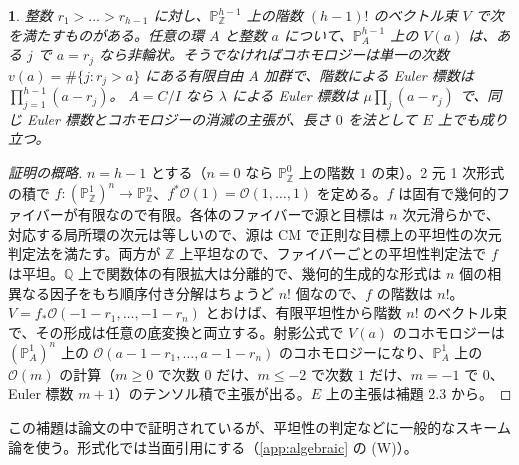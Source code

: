 \documentclass[11pt,a4paper]{ltjsarticle}
\newcommand{\stmtname}{}
\theoremstyle{plain}
\newtheorem*{stmtgen}{\stmtname}
\newenvironment{stmt}[1]{\renewcommand{\stmtname}{#1}\begin{stmtgen}}{\end{stmtgen}}
\theoremstyle{definition}
\newcommand{\Z}{\mathbb{Z}}
\newcommand{\Q}{\mathbb{Q}}
\newcommand{\PP}{\mathbb{P}}
\newcommand{\cO}{\mathcal{O}}
\begin{document}
\begin{stmt}{補題 2.6（Eisenbud--Schreyer の構成）}
整数 $r_1>\dots>r_{h-1}$ に対し、$\PP^{h-1}_\Z$ 上の階数 $(h-1)!$ のベクトル束 $V$ で次を満たすものがある。任意の環 $A$ と整数 $a$ について、$\PP^{h-1}_A$ 上の $V(a)$ は、ある $j$ で $a = r_j$ なら非輪状。そうでなければコホモロジーは単一の次数
$v(a) = \#\{j: r_j>a\}$
にある有限自由 $A$ 加群で、階数による Euler 標数は $\prod_{j=1}^{h-1}(a-r_j)$。
$A = C/I$ なら $\lambda$ による Euler 標数は $\mu\prod_j(a-r_j)$ で、同じ Euler 標数とコホモロジーの消滅の主張が、長さ $0$ を法として $E$ 上でも成り立つ。
\end{stmt}
\begin{proof}[証明の概略]
$n = h-1$ とする（$n = 0$ なら $\PP^0_\Z$ 上の階数 $1$ の束）。2 元 1 次形式の積で
$f\colon(\PP^1_\Z)^n\to\PP^n_\Z$、$f^*\cO(1) = \cO(1,\dots,1)$
を定める。$f$ は固有で幾何的ファイバーが有限なので有限。各体のファイバーで源と目標は $n$ 次元滑らかで、対応する局所環の次元は等しいので、源は CM で正則な目標上の平坦性の次元判定法を満たす。両方が $\Z$ 上平坦なので、ファイバーごとの平坦性判定法で $f$ は平坦。$\Q$ 上で関数体の有限拡大は分離的で、幾何的生成的な形式は $n$ 個の相異なる因子をもち順序付き分解はちょうど $n!$ 個なので、$f$ の階数は $n!$。
$V = f_*\cO(-1-r_1,\dots,-1-r_n)$
とおけば、有限平坦性から階数 $n!$ のベクトル束で、その形成は任意の底変換と両立する。射影公式で $V(a)$ のコホモロジーは $(\PP^1_A)^n$ 上の $\cO(a-1-r_1,\dots,a-1-r_n)$ のコホモロジーになり、$\PP^1_A$ 上の $\cO(m)$ の計算（$m\ge0$ で次数 $0$ だけ、$m\le-2$ で次数 $1$ だけ、$m = -1$ で $0$、Euler 標数 $m+1$）のテンソル積で主張が出る。$E$ 上の主張は補題 2.3 から。
\end{proof}
この補題は論文の中で証明されているが、平坦性の判定などに一般的なスキーム論を使う。形式化では当面引用にする（\ref{app:algebraic} の (W)）。
\end{document}
